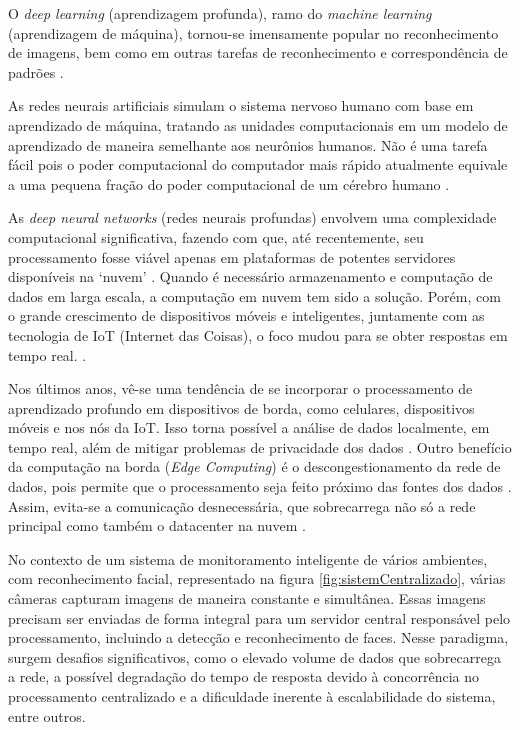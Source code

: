 O \textit{deep learning} (aprendizagem profunda), ramo do \textit{machine learning} (aprendizagem de máquina), tornou-se imensamente popular no reconhecimento de imagens, bem como em outras tarefas de reconhecimento e correspondência de padrões \cite{Verhelst2017}.

As redes neurais artificiais simulam o sistema nervoso humano com base em aprendizado de máquina, tratando as unidades computacionais em um modelo de aprendizado de maneira semelhante aos neurônios humanos. Não é uma tarefa fácil pois o poder computacional do computador mais rápido atualmente equivale a uma pequena fração do poder computacional de um cérebro humano \cite{Aggarwal2018}.

As \textit{deep neural networks} (redes neurais profundas) envolvem uma complexidade computacional significativa, fazendo com que, até recentemente, seu processamento fosse viável apenas em plataformas de potentes servidores disponíveis na ‘nuvem’ \cite{Verhelst2017}. Quando é necessário armazenamento e computação de dados em larga escala, a computação em nuvem tem sido a solução. Porém, com o grande crescimento de dispositivos móveis e inteligentes, juntamente com as tecnologia de IoT (Internet das Coisas), o foco mudou para se obter respostas em tempo real. \cite{Dolui2017}.

Nos últimos anos, vê-se uma tendência de se incorporar o processamento de aprendizado profundo em dispositivos de borda, como celulares, dispositivos móveis e nos nós da IoT. Isso torna possível a análise de dados localmente, em tempo real, além de mitigar problemas de privacidade dos dados \cite{Verhelst2017}. Outro benefício da computação na borda (\textit{Edge Computing}) é o descongestionamento da rede de dados, pois permite que o processamento seja feito próximo das fontes dos dados \cite{Merenda2020}. Assim, evita-se a comunicação desnecessária, que sobrecarrega não só a rede principal como também o datacenter na nuvem \cite{Aazam2014}.

No contexto de um sistema de monitoramento inteligente de vários ambientes, com reconhecimento facial, representado na figura \ref{fig:sistemCentralizado}, várias câmeras capturam imagens de maneira constante e simultânea. Essas imagens precisam ser enviadas de forma integral para um servidor central responsável pelo processamento, incluindo a detecção e reconhecimento de faces. Nesse paradigma, surgem desafios significativos, como o elevado volume de dados que sobrecarrega a rede, a possível degradação do tempo de resposta devido à concorrência no processamento centralizado e a dificuldade inerente à escalabilidade do sistema, entre outros.

